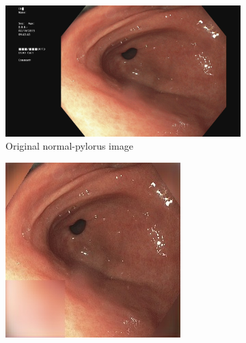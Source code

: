     
        \begin{figure}
        \tiny
		\begin{subfigure}[t]{\myfigsizethree}
            \centering
            \includegraphics[height=\textwidth ,width=\textwidth]{experiments/figures/both/NPORIG.jpg}
            \caption{Original normal-pylorus image}    
            \label{fig:np_ORIG_both1}
        \end{subfigure}
        \qquad
        \begin{subfigure}[t]{\myfigsizethree}
            \centering
            \includegraphics[width=\textwidth]{experiments/figures/both/NPAE.jpg}

\end{subfigure}
\end{figure}

